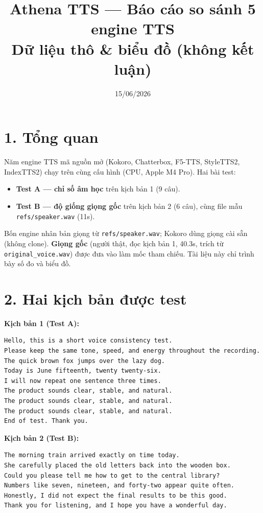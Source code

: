 \documentclass[11pt]{article}
\title{\textbf{Athena TTS — Báo cáo so sánh 5 engine TTS}\\[2pt]
\large Dữ liệu thô \& biểu đồ (không kết luận)}
\author{}
\date{15/06/2026}
\begin{document}
\maketitle
\vspace{-1.5em}

\section*{1. Tổng quan}
Năm engine TTS mã nguồn mở (Kokoro, Chatterbox, F5-TTS, StyleTTS2, IndexTTS2) chạy trên
cùng cấu hình (CPU, Apple M4 Pro). Hai bài test:
\begin{itemize}\setlength\itemsep{1pt}
\item \textbf{Test A — chỉ số âm học} trên kịch bản 1 (9 câu).
\item \textbf{Test B — độ giống giọng gốc} trên kịch bản 2 (6 câu), cùng file mẫu \texttt{refs/speaker.wav} (11s).
\end{itemize}
Bốn engine nhân bản giọng từ \texttt{refs/speaker.wav}; Kokoro dùng giọng cài sẵn (không clone).
\textbf{Giọng gốc} (người thật, đọc kịch bản 1, 40.3s, trích từ \texttt{original\_voice.wav})
được đưa vào làm mốc tham chiếu. Tài liệu này chỉ trình bày số đo và biểu đồ.

\section*{2. Hai kịch bản được test}
\textbf{Kịch bản 1 (Test A):}
\begin{Verbatim}[frame=single,fontsize=\footnotesize,rulecolor=\color{gray}]
Hello, this is a short voice consistency test.
Please keep the same tone, speed, and energy throughout the recording.
The quick brown fox jumps over the lazy dog.
Today is June fifteenth, twenty twenty-six.
I will now repeat one sentence three times.
The product sounds clear, stable, and natural.
The product sounds clear, stable, and natural.
The product sounds clear, stable, and natural.
End of test. Thank you.
\end{Verbatim}
\textbf{Kịch bản 2 (Test B):}
\begin{Verbatim}[frame=single,fontsize=\footnotesize,rulecolor=\color{gray}]
The morning train arrived exactly on time today.
She carefully placed the old letters back into the wooden box.
Could you please tell me how to get to the central library?
Numbers like seven, nineteen, and forty-two appear quite often.
Honestly, I did not expect the final results to be this good.
Thank you for listening, and I hope you have a wonderful day.
\end{Verbatim}
\end{document}
